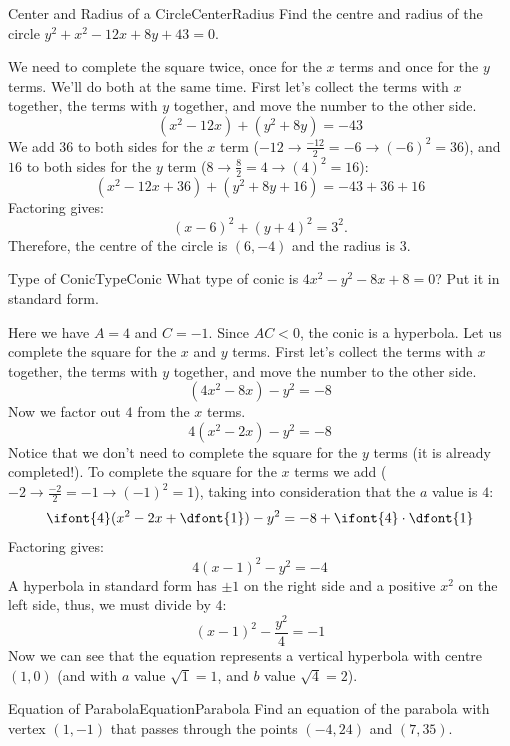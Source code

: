 \begin{example}{Center and Radius of a Circle}{CenterRadius}
Find the centre and radius of the circle $y^2 + x^2 - 12x + 8y + 43 = 0$.
\end{example}

\begin{solution} 
We need to complete the square twice, once for the $x$ terms and once for the $y$ terms.
We'll do both at the same time.
First let's collect the terms with $x$ together, the terms with $y$ together, and move the number to the other side.
$$(x^2-12x)+(y^2+8y)=-43$$
We add $36$ to both sides for the $x$ term ($-12\to \frac{-12}{2}=-6\to (-6)^2=36$), and $16$ to both sides for the $y$ term ($8\to \frac{8}{2}=4\to (4)^2=16$):
$$(x^2-12x+36)+(y^2+8y+16)=-43+36+16$$
Factoring gives:
$$(x-6)^2+(y+4)^2=3^2.$$
Therefore, the centre of the circle is $(6,-4)$ and the radius is $3$.
\end{solution} 

\begin{example}{Type of Conic}{TypeConic}
What type of conic is $4x^2-y^2-8x+8=0$?
Put it in standard form.
\end{example}

\begin{solution} 
Here we have $A=4$ and $C=-1$.
Since $AC<0$, the conic is a hyperbola.
Let us complete the square for the $x$ and $y$ terms.
First let's collect the terms with $x$ together, the terms with $y$ together, and move the number to the other side.
$$(4x^2-8x)-y^2=-8$$
Now we factor out $4$ from the $x$ terms.
$$4(x^2-2x)-y^2=-8$$
Notice that we don't need to complete the square for the $y$ terms (it is already completed!). To complete the square for the $x$ terms we add  ($-2\to\frac{-2}{2}=-1\to(-1)^2=1$), taking into consideration that the $a$ value is $4$:
$$\ifont{4}(x^2-2x+\dfont{1})-y^2=-8+\ifont{4}\cdot\dfont{1}$$
Factoring gives:
$$4(x-1)^2-y^2=-4$$
A hyperbola in standard form has $\pm1$ on the right side and a positive $x^2$ on the left side, thus, we must divide by $4$:
$$(x-1)^2-\frac{y^2}{4}=-1$$
Now we can see that the equation represents a vertical hyperbola with centre $(1,0)$ (and with $a$ value $\sqrt{1}=1$, and $b$ value $\sqrt{4}=2$).
\end{solution} 




\begin{example}{Equation of Parabola}{EquationParabola}\label{EquationParabola}
Find an equation of the parabola with vertex $(1,-1)$ that passes through the points $(-4, 24)$ and $(7, 35)$.
\end{example}

